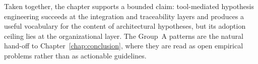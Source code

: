 Taken together, the chapter supports a bounded claim: tool-mediated
hypothesis engineering succeeds at the integration and traceability layers
and produces a useful vocabulary for the content of architectural
hypotheses, but its adoption ceiling lies at the organizational layer. The
Group~A patterns are the natural hand-off to
Chapter~\ref{chap:conclusion}, where they are read as open empirical problems rather than as actionable guidelines.
